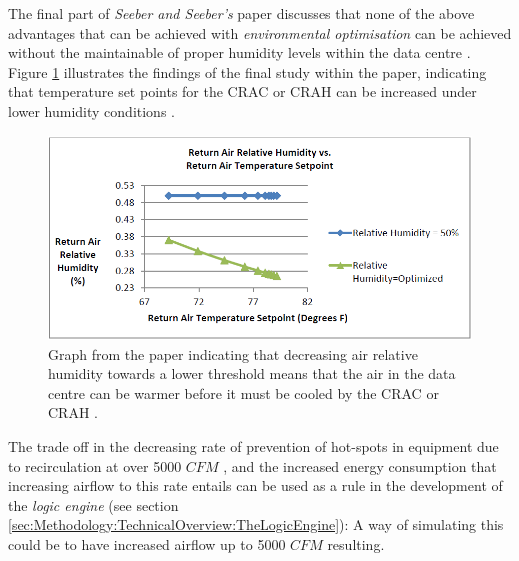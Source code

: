 The final part of \emph{Seeber and Seeber's} paper discusses that none of the above advantages that can be achieved with \emph{environmental optimisation} can be achieved without the maintainable of proper humidity levels within the \gls{data centre} \cite[Impact of Increased Air Flow, Increased CRAC Return Temperature and Optimized Humidity Level on Operation Costs]{SeeberAndSeeberImprovingDataCenterEnergyEfficiencyThroughEnvironmentalOptimization}. Figure \ref{fig:SeeberAndSeeberHumidityEffect} illustrates the findings of the final study within the paper, indicating that temperature set points for the \gls{CRAC} or \gls{CRAH} can be increased under lower humidity conditions \cite[The Numbers: How Much Can You Really Save Through Environmental Optimization?]{SeeberAndSeeberImprovingDataCenterEnergyEfficiencyThroughEnvironmentalOptimization}.

\begin{figure}[H]
\centering
\includegraphics[width=5in]{Resources//SeeberAndSeeberHumidityEffect.png}
\caption{Graph from the paper indicating that  decreasing air relative humidity towards a lower threshold means that the air in the data centre can be warmer before it must be cooled by the \gls{CRAC} or \gls{CRAH} \cite[The Numbers: How Much Can You Really Save Through Environmental Optimization?]{SeeberAndSeeberImprovingDataCenterEnergyEfficiencyThroughEnvironmentalOptimization}.}
\label{fig:SeeberAndSeeberHumidityEffect}
\end{figure}

The trade off in the decreasing rate of prevention of hot-spots in equipment due to \gls{recirculation} at over 5000 $CFM$ \cite[The Numbers: How Much Can You Really Save Through Environmental Optimization?]{SeeberAndSeeberImprovingDataCenterEnergyEfficiencyThroughEnvironmentalOptimization}, and the increased energy consumption that increasing airflow to this rate entails can be used as a rule in the development of the \emph{logic engine} (see section \ref{sec:Methodology:TechnicalOverview:TheLogicEngine}): A way of simulating this could be to have increased airflow up to 5000 $CFM$ resulting.

